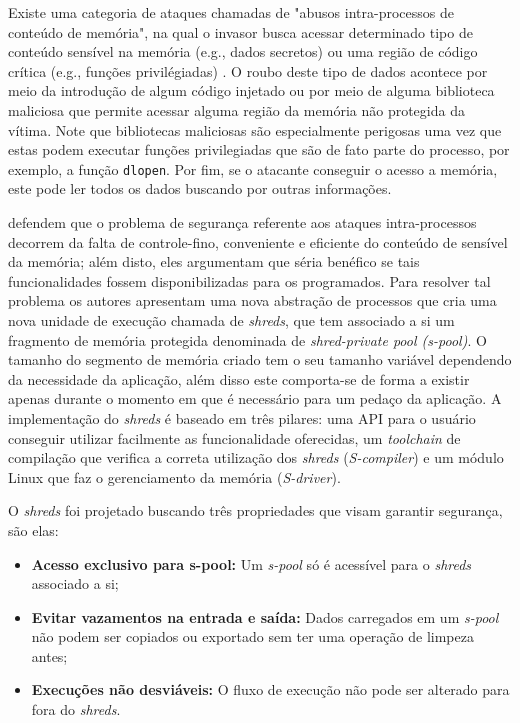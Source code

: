 Existe uma categoria de ataques chamadas de "abusos intra-processos de conteúdo
de memória", na qual o invasor busca acessar determinado tipo de conteúdo
sensível na memória (e.g., dados secretos) ou uma região de código crítica
(e.g., funções privilégiadas) \cite{shreds}. O roubo deste tipo de dados
acontece por meio da introdução de algum código injetado ou por meio de alguma
biblioteca maliciosa que permite acessar alguma região da memória não protegida
da vítima. Note que bibliotecas maliciosas são especialmente perigosas uma vez
que estas podem executar funções privilegiadas que são de fato parte do
processo, por exemplo, a função \texttt{dlopen}. Por fim, se o atacante
conseguir o acesso a memória, este pode ler todos os dados buscando por outras
informações.

\cite{shreds} defendem que o problema de segurança referente aos ataques
intra-processos decorrem da falta de controle-fino, conveniente e eficiente do
conteúdo de sensível da memória; além disto, eles argumentam que séria benéfico
se tais funcionalidades fossem disponibilizadas para os programados.  Para
resolver tal problema os autores apresentam uma nova abstração de processos que
cria uma nova unidade de execução chamada de \emph{shreds}, que tem associado a
si um fragmento de memória protegida denominada de \emph{shred-private pool
(s-pool)}. O tamanho do segmento de memória criado tem o seu tamanho variável
dependendo da necessidade da aplicação, além disso este comporta-se de forma a
existir apenas durante o momento em que é necessário para um pedaço da
aplicação. A implementação do \emph{shreds} é baseado em três pilares: uma API
para o usuário conseguir utilizar facilmente as funcionalidade oferecidas, um
\emph{toolchain} de compilação que verifica a correta utilização dos
\emph{shreds} (\emph{S-compiler}) e um módulo Linux que faz o gerenciamento da
memória (\emph{S-driver}).

O \emph{shreds} foi projetado buscando três propriedades que visam garantir
segurança, são elas:

\begin{itemize}
  \item \textbf{Acesso exclusivo para s-pool:} Um \emph{s-pool} só é acessível
        para o \emph{shreds} associado a si;
  \item \textbf{Evitar vazamentos na entrada e saída:} Dados carregados em um
        \emph{s-pool} não podem ser copiados ou exportado sem ter uma operação
        de limpeza antes;
  \item \textbf{Execuções não desviáveis:} O fluxo de execução não pode ser
        alterado para fora do \emph{shreds}.
\end{itemize}


